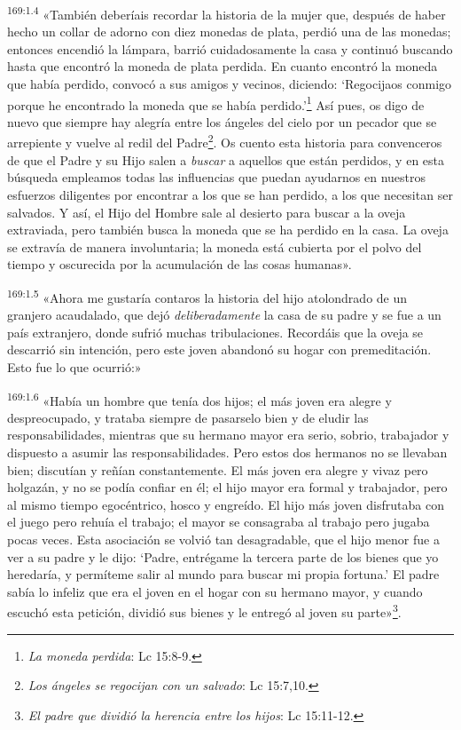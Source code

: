 \par
\textsuperscript{169:1.4} «También deberíais recordar la historia de la mujer que, después de haber hecho un collar de adorno con diez monedas de plata, perdió una de las monedas; entonces encendió la lámpara, barrió cuidadosamente la casa y continuó buscando hasta que encontró la moneda de plata perdida. En cuanto encontró la moneda que había perdido, convocó a sus amigos y vecinos, diciendo: `Regocijaos conmigo porque he encontrado la moneda que se había perdido.'\footnote{\textit{La moneda perdida}: Lc 15:8-9.} Así pues, os digo de nuevo que siempre hay alegría entre los ángeles del cielo por un pecador que se arrepiente y vuelve al redil del Padre\footnote{\textit{Los ángeles se regocijan con un salvado}: Lc 15:7,10.}. Os cuento esta historia para convenceros de que el Padre y su Hijo salen a \textit{buscar} a aquellos que están perdidos, y en esta búsqueda empleamos todas las influencias que puedan ayudarnos en nuestros esfuerzos diligentes por encontrar a los que se han perdido, a los que necesitan ser salvados. Y así, el Hijo del Hombre sale al desierto para buscar a la oveja extraviada, pero también busca la moneda que se ha perdido en la casa. La oveja se extravía de manera involuntaria; la moneda está cubierta por el polvo del tiempo y oscurecida por la acumulación de las cosas humanas».

\par
\textsuperscript{169:1.5} «Ahora me gustaría contaros la historia del hijo atolondrado de un granjero acaudalado, que dejó \textit{deliberadamente} la casa de su padre y se fue a un país extranjero, donde sufrió muchas tribulaciones. Recordáis que la oveja se descarrió sin intención, pero este joven abandonó su hogar con premeditación. Esto fue lo que ocurrió:»

\par
\textsuperscript{169:1.6} «Había un hombre que tenía dos hijos; el más joven era alegre y despreocupado, y trataba siempre de pasarselo bien y de eludir las responsabilidades, mientras que su hermano mayor era serio, sobrio, trabajador y dispuesto a asumir las responsabilidades. Pero estos dos hermanos no se llevaban bien; discutían y reñían constantemente. El más joven era alegre y vivaz pero holgazán, y no se podía confiar en él; el hijo mayor era formal y trabajador, pero al mismo tiempo egocéntrico, hosco y engreído. El hijo más joven disfrutaba con el juego pero rehuía el trabajo; el mayor se consagraba al trabajo pero jugaba pocas veces. Esta asociación se volvió tan desagradable, que el hijo menor fue a ver a su padre y le dijo: `Padre, entrégame la tercera parte de los bienes que yo heredaría, y permíteme salir al mundo para buscar mi propia fortuna.' El padre sabía lo infeliz que era el joven en el hogar con su hermano mayor, y cuando escuchó esta petición, dividió sus bienes y le entregó al joven su parte»\footnote{\textit{El padre que dividió la herencia entre los hijos}: Lc 15:11-12.}.


